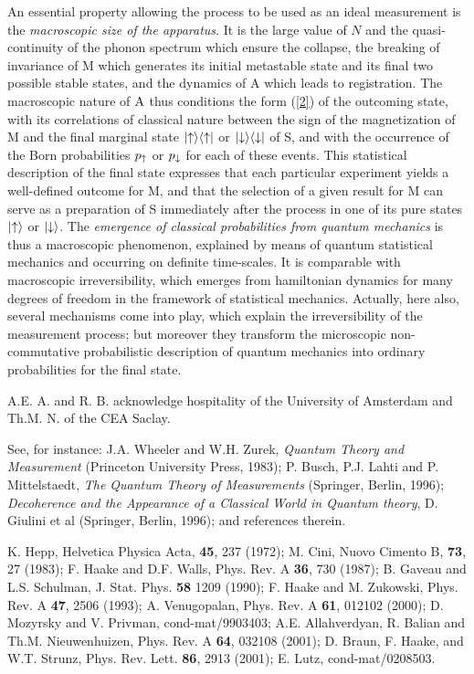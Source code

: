 \begin{multicols}{2}
An essential property allowing the process to be used as an ideal
measurement is the {\it macroscopic size of the apparatus}. It is the large
value of $N$ and the quasi-continuity of the phonon spectrum which ensure
the collapse, the breaking of invariance of M which generates its initial 
metastable state and its final two possible stable states,
and the dynamics of A which leads
to registration. The macroscopic nature of ${\rm A}$ thus 
conditions the form (\ref{2}) of the outcoming state, with
its correlations of classical nature between the sign of the magnetization
of M and the final marginal state $|{\uparrow}\rangle\langle {\uparrow}|$
or $|{\downarrow}\rangle\langle {\downarrow}|$ of S, and with the occurrence of the Born
probabilities $p_{\uparrow}$ or $p_{\downarrow}$ for each of these events.
This statistical description of the final state expresses that each particular
experiment yields a well-defined outcome for M, and that the selection
of a given result for M can serve as a preparation of S immediately
after the process in one of its pure states $|{\uparrow}\rangle$ or $|{\downarrow}\rangle$.
The {\it emergence of classical probabilities from quantum mechanics} is thus
a macroscopic phenomenon, explained by means of quantum statistical mechanics
and occurring on definite time-scales. It is comparable with macroscopic
irreversibility, which emerges from hamiltonian dynamics 
for many degrees of freedom in the framework
of statistical mechanics. Actually, here also, several mechanisms come into
play, which explain the irreversibility of the measurement process;
but moreover they transform the microscopic non-commutative probabilistic 
description of quantum mechanics into ordinary probabilities for the final 
state.


A.E. A. and R. B. acknowledge hospitality of the University
of Amsterdam and Th.M. N. of the CEA Saclay.

\begin{thebibliography}{99}
\vspace{-1cm}

 See, for instance:
J.A. Wheeler and W.H. Zurek,
{\it Quantum Theory and Measurement} (Princeton University Press, 1983);
P. Busch, P.J. Lahti and P. Mittelstaedt, {\it The
Quantum Theory of Measurements} (Springer, Berlin, 1996);
{\it Decoherence and the Appearance of a Classical World
in Quantum theory}, D. Giulini et al (Springer, Berlin, 1996);
and references therein.

 K. Hepp, Helvetica Physica Acta, {\bf 45}, 237 (1972);
M. Cini, Nuovo Cimento B, {\bf 73}, 27 (1983);
F. Haake and D.F. Walls, Phys. Rev. A {\bf 36}, 730 (1987);
B. Gaveau and L.S. Schulman, J. Stat. Phys. {\bf 58} 1209 (1990); 
F. Haake and M. Zukowski, Phys. Rev. A {\bf 47}, 2506 (1993);
A. Venugopalan, Phys. Rev. A {\bf 61}, 012102 (2000);
D. Mozyrsky and V. Privman, cond-mat/9903403;
A.E. Allahverdyan, R. Balian and Th.M. Nieuwenhuizen, 
Phys. Rev. A {\bf 64}, 032108 (2001);
D. Braun, F. Haake, and W.T. Strunz,
Phys. Rev. Lett. {\bf 86}, 2913 (2001);
E. Lutz, cond-mat/0208503.



\end{thebibliography}
\end{multicols}
